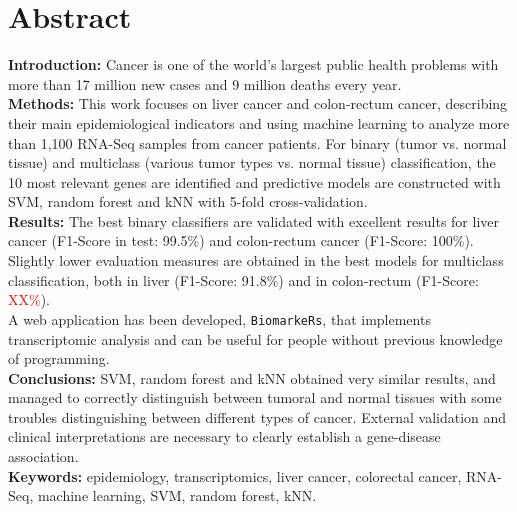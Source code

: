 \newpage
\thispagestyle{plain}

\section*{Abstract}

\textbf{Introduction:} Cancer is one of the world's largest public health problems with more than 17 million new cases and 9 million deaths every year. \\

\textbf{Methods:} This work focuses on liver cancer and colon-rectum cancer, describing their main epidemiological indicators and using machine learning to analyze more than 1,100 RNA-Seq samples from cancer patients. For binary (tumor vs. normal tissue) and multiclass (various tumor types vs. normal tissue) classification, the 10 most relevant genes are identified and predictive models are constructed with SVM, random forest and kNN with 5-fold cross-validation. \\

\textbf{Results:} The best binary classifiers are validated with excellent results for liver cancer (F1-Score in test: 99.5\%) and colon-rectum cancer (F1-Score: 100\%). Slightly lower evaluation measures are obtained in the best models for multiclass classification, both in liver (F1-Score: 91.8\%) and in colon-rectum (F1-Score: \textcolor{red}{XX\%}). \\

A web application has been developed, \texttt {BiomarkeRs}, that implements transcriptomic analysis and can be useful for people without previous knowledge of programming. \\

\textbf {Conclusions:} SVM, random forest and kNN obtained very similar results, and managed to correctly distinguish between tumoral and normal tissues with some troubles distinguishing between different types of cancer. External validation and clinical interpretations are necessary to clearly establish a gene-disease association.\\


\textbf{Keywords:} epidemiology, transcriptomics, liver cancer, colorectal cancer, RNA-Seq, machine learning, SVM, random forest, kNN.

\newpage
\thispagestyle{empty}

